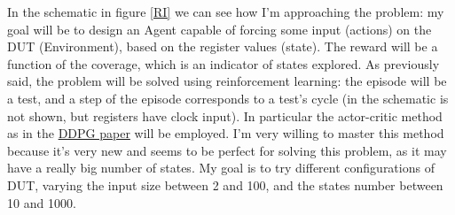 \documentclass{article}
\begin{document}
In the schematic in figure \ref{RI} we can see how I'm approaching the problem: my goal will be to design an Agent capable of forcing some input (actions) on the DUT (Environment), based on the register values (state). The reward will be a function of the coverage, which is an indicator of states explored.
As previously said, the problem will be solved using reinforcement learning: the episode will be a test, and a step of the episode corresponds to a test's cycle (in the schematic is not shown, but registers have clock input). In particular the actor-critic method as in the \href{https://arxiv.org/pdf/1509.02971.pdf}{DDPG paper} will be employed. I'm very willing to master this method because it's very new and seems to be perfect for solving this problem, as it may have a really big number of states. My goal is to try different configurations of DUT, varying the input size between 2 and 100, and the states number between 10 and 1000.
\end{document}
